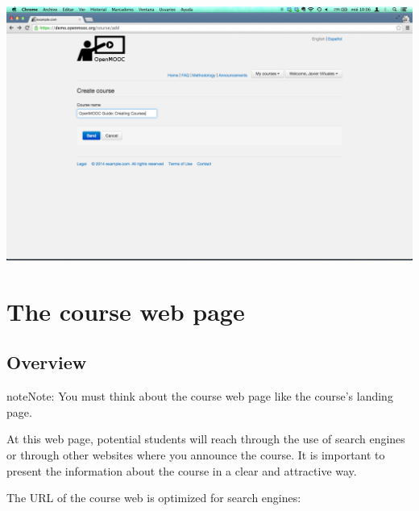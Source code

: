 \documentclass[letterpaper,10pt,english]{sphinxmanual}
\begin{document}
\begin{enumerate}
\includegraphics{1_create_course-3.png}

\end{enumerate}


\chapter{The course web page}
\label{course_page:course-page}\label{course_page::doc}\label{course_page:the-course-web-page}

\section{Overview}
\label{course_page:overview}
\begin{notice}{note}{Note:}
You must think about the course web page like the course's landing page.
\end{notice}

At this web page, potential students will reach through the use of search engines or through
other websites where you announce the course. It is important to present the information about the course in a clear and attractive way.

The URL of the course web is optimized for search engines:

\end{document}

